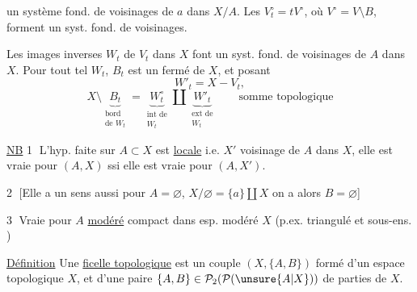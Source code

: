 un système fond. de voisinages de $a$ dans $X/A$.
Les $V_t^\circ=tV^\circ$, où $V^\circ=V\setminus B$,
forment un syst. fond. de voisinages.


Les images inverses $W_t$ de $V_t$ dans $X$ font un syst. fond. de voisinages de $A$ dans $X$.
 Pour tout tel $W_t$,  $B_t$
 est
un fermé de $X$, et posant 
\[
W'_t=X-V_t,
\]
\[
X\setminus\underbrace{B_t}_{\substack{\text{bord}\\\text{de }W_t}}
=
\underbrace{W_t^\circ}_{\substack{\text{int de}\\W_t}}
\amalg
\underbrace{W'_t}_{\substack{\text{ext de}\\W_t}}
\qquad\text{somme topologique}
\]

\uline{NB} \textcircled{1} L'hyp. faite sur $A\subset X$ est \uline{locale}
i.e.  $X'$ voisinage de $A$ dans $X$,
elle est vraie pour $(A,X)$ ssi elle est vraie pour $(A,X')$.

\textcircled{2} [Elle a un sens aussi pour $A=\varnothing$,
$X/\varnothing=\{a\}\amalg X$ on a alors $B=\varnothing$]

\textcircled{3} Vraie pour $A$  \uline{modéré} compact dans esp. modéré $X$
(p.ex.  triangulé et sous-ens. )


\uline{Définition} Une \uline{ficelle topologique}
est un couple $(X,\{A,B\})$ formé d'un espace topologique $X$, et d'une paire
$\{A,B\}\in\mathcal P_2(\mathcal P(\unsure{A|X}))$ de parties de $X$.

